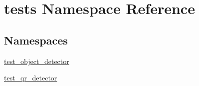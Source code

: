 \hypertarget{namespacetests}{}\section{tests Namespace Reference}
\label{namespacetests}
\subsection*{Namespaces}
\begin{DoxyCompactItemize}
\item 
 \hyperlink{namespacetests_1_1test__object__detector}{test\+\_\+object\+\_\+detector}
\item 
 \hyperlink{namespacetests_1_1test__qr__detector}{test\+\_\+qr\+\_\+detector}
\end{DoxyCompactItemize}
